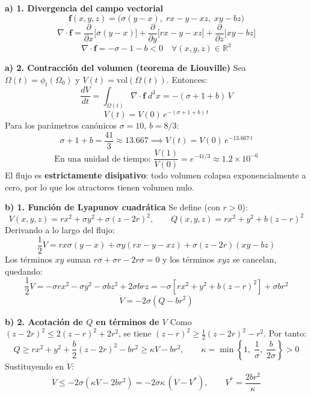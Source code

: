 \documentclass[11pt,a4paper]{article}
\newenvironment{solucion}[1][Solución Detallada]{%
    \vspace{1.5mm}%
    \noindent{\large\textbf{Solución:}}\par\vspace{1.5mm}%
}{%
    \par\vspace{3mm}%
}
\begin{document}
\begin{solucion}

\textbf{\large a) 1. Divergencia del campo vectorial}
\[
\mathbf{f}(x,y,z) = \bigl(\sigma(y-x),\; r x - y - x z,\; x y - b z\bigr)
\]
\[
\nabla \cdot \mathbf{f} = \frac{\partial}{\partial x}\bigl[\sigma(y-x)\bigr] + \frac{\partial}{\partial y}\bigl[r x - y - x z\bigr] + \frac{\partial}{\partial z}\bigl[x y - b z\bigr]
\]
\[
\boxed{\nabla \cdot \mathbf{f} = -\sigma - 1 - b < 0 \quad \forall (x,y,z) \in \mathbb{R}^3}
\]

\vspace{3.5mm}

\textbf{\large a) 2. Contracción del volumen (teorema de Liouville)}
Sea $\Omega(t) = \phi_t(\Omega_0)$ y $V(t) = \mathrm{vol}(\Omega(t))$. Entonces:
\[
\frac{dV}{dt} = \int_{\Omega(t)} \nabla \cdot \mathbf{f}\; d^3x = -(\sigma + 1 + b)\,V
\]
\[
\boxed{V(t) = V(0)\, e^{-(\sigma + 1 + b)\,t}}
\]
Para los parámetros canónicos $\sigma = 10$, $b = 8/3$:
\[
\sigma + 1 + b = \frac{41}{3} \approx 13.667 \implies V(t) = V(0)\,e^{-13.667\,t}
\]
\[
\text{En una unidad de tiempo: } \frac{V(1)}{V(0)} = e^{-41/3} \approx 1.2 \times 10^{-6}
\]
El flujo es \textbf{estrictamente disipativo}: todo volumen colapsa exponencialmente a cero, por lo que los atractores tienen volumen nulo.

\vspace{3.5mm}

\textbf{\large b) 1. Función de Lyapunov cuadrática}
Se define (con $r > 0$):
\[
V(x,y,z) = r x^2 + \sigma y^2 + \sigma (z - 2r)^2, \qquad Q(x,y,z) = r x^2 + y^2 + b(z - r)^2
\]
Derivando a lo largo del flujo:
\[
\frac{1}{2}\dot{V} = r x \sigma (y - x) + \sigma y (r x - y - x z) + \sigma (z - 2r)(x y - b z)
\]
Los términos $xy$ suman $r\sigma + \sigma r - 2r\sigma = 0$ y los términos $xyz$ se cancelan, quedando:
\[
\frac{1}{2}\dot{V} = -\sigma r x^2 - \sigma y^2 - \sigma b z^2 + 2\sigma b r z = -\sigma\left[r x^2 + y^2 + b(z - r)^2\right] + \sigma b r^2
\]
\[
\boxed{\dot{V} = -2\sigma\left(Q - b r^2\right)}
\]

\vspace{3.5mm}

\textbf{\large b) 2. Acotación de $Q$ en términos de $V$}
Como $(z - 2r)^2 \le 2(z - r)^2 + 2r^2$, se tiene $(z - r)^2 \ge \tfrac{1}{2}(z - 2r)^2 - r^2$. Por tanto:
\[
Q \ge r x^2 + y^2 + \frac{b}{2}(z - 2r)^2 - b r^2 \ge \kappa V - b r^2, \qquad \kappa = \min\left\{1, \; \frac{1}{\sigma}, \; \frac{b}{2\sigma}\right\} > 0
\]
Sustituyendo en $\dot V$:
\[
\dot{V} \le -2\sigma\left(\kappa V - 2 b r^2\right) = -2\sigma\kappa\,(V - V^*), \qquad V^* = \frac{2 b r^2}{\kappa}
\]


\end{solucion}
\end{document}
